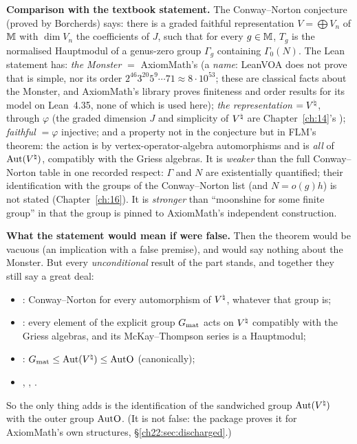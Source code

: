 \begin{dictionary}
\textbf{Comparison with the textbook statement.}  The Conway--Norton conjecture (proved by Borcherds) says: there is a graded
faithful representation $V=\bigoplus V_n$ of $\mathbb{M}$ with $\dim V_n$ the coefficients of $J$, such that for every
$g\in\mathbb{M}$, $T_g$ is the normalised Hauptmodul of a genus-zero group $\Gamma_g$ containing $\Gamma_0(N)$.  The Lean
statement has: \emph{the Monster} $=$ AxiomMath's  (a \emph{name}: LeanVOA does not prove that  is simple,
nor its order $2^{46}3^{20}5^9\cdots71\approx8\cdot10^{53}$; these are classical facts about the Monster, and AxiomMath's library
proves finiteness and order results for its model on Lean~4.35, none of which is used here); \emph{the representation} $={V^{\natural}}$, through $\varphi$ (the graded
dimension $J$ and simplicity of ${V^{\natural}}$ are Chapter~\ref{ch:14}'s ); \emph{faithful} $=\varphi$ injective; and
a property not in the conjecture but in FLM's theorem: the action is by vertex-operator-algebra automorphisms and is
\emph{all} of $\operatorname{Aut}({V^{\natural}})$, compatibly with the Griess algebras.  It is \emph{weaker} than the full Conway--Norton table in one
recorded respect: $\Gamma$ and $N$ are existentially quantified; their identification with the groups of the Conway--Norton
list (and $N=o(g)h$) is not stated (Chapter~\ref{ch:16}).  It is \emph{stronger} than ``moonshine for some finite group'' in that
the group is pinned to AxiomMath's independent construction.

\textbf{What the statement would mean if  were false.}  Then the theorem would be vacuous (an implication
with a false premise), and would say nothing about the Monster.  But every \emph{unconditional} result of the part stands, and
together they still say a great deal:
\begin{itemize}
\item {}: Conway--Norton for every automorphism of ${V^{\natural}}$, whatever that group is;
\item {}: every element of the explicit group $G_{\mathrm{mat}}$ acts on ${V^{\natural}}$ compatibly with the
  Griess algebras, and its McKay--Thompson series is a Hauptmodul;
\item {}: $G_{\mathrm{mat}}\le\operatorname{Aut}({V^{\natural}})\le\mathrm{AutO}$ (canonically);
\item {}, , .
\end{itemize}
So the only thing  adds is the identification of the sandwiched group $\operatorname{Aut}({V^{\natural}})$ with the outer group
$\mathrm{AutO}$.  (It is not false: the package  proves it for AxiomMath's own structures,
\S\ref{ch22:sec:discharged}.)


\end{dictionary}
